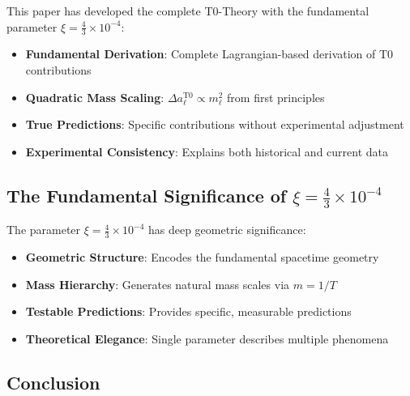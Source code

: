 \documentclass[12pt,a4paper]{article}
\begin{document}
	\begin{keyresult}
		This paper has developed the complete T0-Theory with the fundamental parameter $\xi = \frac{4}{3} \times 10^{-4}$:
		
		\begin{itemize}
			\item \textbf{Fundamental Derivation}: Complete Lagrangian-based derivation of T0 contributions
			\item \textbf{Quadratic Mass Scaling}: $\Delta a_\ell^{\mathrm{T0}} \propto m_\ell^2$ from first principles
			\item \textbf{True Predictions}: Specific contributions without experimental adjustment
			\item \textbf{Experimental Consistency}: Explains both historical and current data
		\end{itemize}
	\end{keyresult}
	
	\subsection{The Fundamental Significance of $\xi = \frac{4}{3} \times 10^{-4}$}
	
	The parameter $\xi = \frac{4}{3} \times 10^{-4}$ has deep geometric significance:
	
	\begin{itemize}
		\item \textbf{Geometric Structure}: Encodes the fundamental spacetime geometry
		\item \textbf{Mass Hierarchy}: Generates natural mass scales via $m = 1/T$
		\item \textbf{Testable Predictions}: Provides specific, measurable predictions
		\item \textbf{Theoretical Elegance}: Single parameter describes multiple phenomena
	\end{itemize}
	
	\subsection{Conclusion}
	
\end{document}
